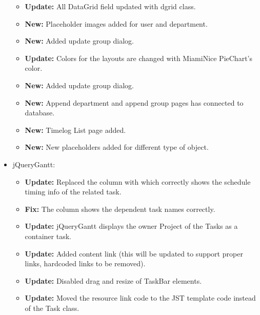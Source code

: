 \documentclass[a4paper,10pt,english]{sphinxmanual}
\begin{document}
\begin{itemize}
\begin{itemize}
\item {} 
\textbf{Update:} All DataGrid field updated with dgrid class.

\item {} 
\textbf{New:} Placeholder images added for user and department.

\item {} 
\textbf{New:} Added update group dialog.

\item {} 
\textbf{Update:} Colors for the layouts are changed with MiamiNice PieChart's color.

\item {} 
\textbf{New:} Added update group dialog.

\item {} 
\textbf{New:} Append department and append group pages has connected to database.

\item {} 
\textbf{New:} Timelog List page added.

\item {} 
\textbf{New:} New placeholders added for different type of object.

\end{itemize}

\item {} 
jQueryGantt:
\begin{itemize}
\item {} 
\textbf{Update:} Replaced the  column with  which correctly
shows the schedule timing info of the related task.

\item {} 
\textbf{Fix:} The  column shows the dependent task names correctly.

\item {} 
\textbf{Update:} jQueryGantt displays the owner Project of the Tasks as a container
task.

\item {} 
\textbf{Update:} Added content link (this will be updated to support proper links,
hardcoded links to be removed).

\item {} 
\textbf{Update:} Disabled drag and resize of TaskBar elements.

\item {} 
\textbf{Update:} Moved the resource link code to the JST template code instead of
the Task class.

\end{itemize}

\end{itemize}
\end{document}
